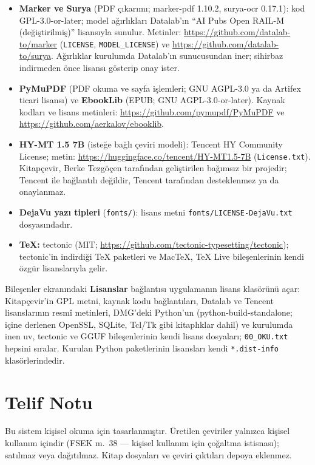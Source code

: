 \documentclass[11pt,a4paper]{article}
\newcommand{\dugme}[1]{\textsf{\bfseries #1}}
\newcommand{\dosya}[1]{\texttt{#1}}
\begin{document}
\begin{itemize}
  \item \textbf{Marker ve Surya} (PDF çıkarımı; marker-pdf 1.10.2, surya-ocr
        0.17.1): kod GPL-3.0-or-later; model ağırlıkları Datalab'ın ``AI Pubs
        Open RAIL-M (değiştirilmiş)'' lisansıyla sunulur. Metinler:
        \url{https://github.com/datalab-to/marker} (\dosya{LICENSE},
        \dosya{MODEL\_LICENSE}) ve \url{https://github.com/datalab-to/surya}.
        Ağırlıklar kurulumda Datalab'ın sunucusundan iner; sihirbaz
        indirmeden önce lisansı gösterip onay ister.
  \item \textbf{PyMuPDF} (PDF okuma ve sayfa işlemleri; GNU AGPL-3.0 ya da
        Artifex ticari lisansı) ve \textbf{EbookLib} (EPUB; GNU
        AGPL-3.0-or-later). Kaynak kodları ve lisans metinleri:
        \url{https://github.com/pymupdf/PyMuPDF} ve
        \url{https://github.com/aerkalov/ebooklib}.
  \item \textbf{HY-MT 1.5 7B} (isteğe bağlı çeviri modeli): Tencent HY
        Community License; metin:
        \url{https://huggingface.co/tencent/HY-MT1.5-7B}
        (\dosya{License.txt}). Kitapçevir, Berke Tezgöçen tarafından
        geliştirilen bağımsız bir projedir; Tencent ile bağlantılı değildir,
        Tencent tarafından desteklenmez ya da onaylanmaz.
  \item \textbf{DejaVu yazı tipleri} (\dosya{fonts/}): lisans metni
        \dosya{fonts/\allowbreak LICENSE-DejaVu.txt} dosyasındadır.
  \item \textbf{TeX:} tectonic (MIT;
        \url{https://github.com/tectonic-typesetting/tectonic}); tectonic'in
        indirdiği TeX paketleri ve MacTeX, TeX Live bileşenlerinin kendi
        özgür lisanslarıyla gelir.
\end{itemize}

Bileşenler ekranındaki \dugme{Lisanslar} bağlantısı uygulamanın lisans
klasörünü açar: Kitapçevir'in GPL metni, kaynak kodu bağlantıları, Datalab
ve Tencent lisanslarının resmî metinleri, DMG'deki Python'un
(python-build-standalone; içine derlenen OpenSSL, SQLite, Tcl/Tk gibi
kitaplıklar dahil) ve kurulumda inen uv, tectonic ve GGUF bileşenlerinin
kendi lisans dosyaları; \dosya{00\_OKU.txt} hepsini sıralar. Kurulan Python
paketlerinin lisansları kendi \dosya{*.dist-info} klasörlerindedir.

\section{Telif Notu}
Bu sistem kişisel okuma için tasarlanmıştır. Üretilen çeviriler yalnızca
kişisel kullanım içindir (FSEK m.\ 38 --- kişisel kullanım için çoğaltma
istisnası); satılmaz veya dağıtılmaz. Kitap dosyaları ve çeviri çıktıları
depoya eklenmez.
\end{document}

